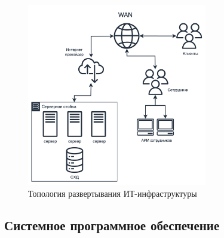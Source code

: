\documentclass[14pt, a4paper]{extarticle}
\begin{document}
\begin{figure}[H]
  \centering
  \includegraphics[width=0.7\textwidth]{infra2.png}
  \caption{Топология развертывания ИТ-инфраструктуры}
  \label{fig:infra2}
\end{figure}

\subsection{Системное программное обеспечение}



\end{document}
